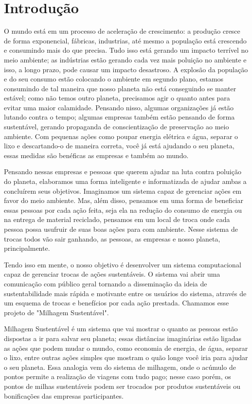 \documentclass[]{article}
\begin{document}
 \section {Introdução}
 O mundo está em um processo de aceleração de crescimento: a produção cresce de forma exponencial, fábricas, industrias, até mesmo a população está crescendo e consumindo mais do que precisa. Tudo isso está gerando um impacto terrível no meio ambiente; as indústrias estão gerando cada vez mais poluição no ambiente e isso, a longo prazo, pode causar um impacto desastroso. A explosão da população e do seu consumo estão colocando o ambiente em segundo plano, estamos consumindo de tal maneira que nosso planeta não está conseguindo se manter estável; como não temos outro planeta, precisamos agir o quanto antes para evitar uma maior calamidade. Pensando nisso, algumas organizações já estão lutando contra o tempo; algumas empresas também estão pensando de forma sustentável, gerando propaganda de conscientização de preservação ao meio ambiente. Com pequenas ações como poupar energia elétrica e água, separar o lixo e descartando-o de maneira correta, você já está ajudando o seu planeta, essas medidas são benéficas as empresas e também ao mundo.

Pensando nessas empresas e pessoas que querem ajudar na luta contra poluição do planeta, elaboramos uma forma inteligente e informatizada de ajudar ambas a concluírem seus objetivos. Imaginamos um sistema capaz de gerenciar ações em favor do meio ambiente. Mas, além disso, pensamos em uma forma de beneficiar essas pessoas por cada ação feita, seja ela na redução do consumo de energia ou na entrega de material reciclado, pensamos em um local de troca onde cada pessoa possa usufruir de suas boas ações para com ambiente. Nesse sistema de trocas todos vão sair ganhando, as pessoas, as empresas e nosso planeta, principalmente.

Tendo isso em mente, o nosso objetivo é desenvolver um sistema computacional capaz de gerenciar trocas de ações sustentáveis. O sistema vai abrir uma comunicação com público geral tornando a disseminação da ideia de sustentabilidade mais rápida e motivante entre os usuários do sistema, através de um esquema de trocas e benefícios por cada ação prestada. Chamamos esse projeto de "Milhagem Sustentável".

Milhagem Sustentável é um sistema que vai mostrar o quanto as pessoas estão dispostas a ir para salvar seu planeta; essas distâncias imaginárias estão ligadas as ações que podem mudar o mundo, como economia de energia, de água, separar o lixo, entre outras ações simples que mostram o quão longe você iria para ajudar o seu planeta. Essa analogia vem do sistema de milhagem, onde o acúmulo de pontos permite a realização de viagens com tudo pago; nesse caso porém, os pontos de milhas sustentáveis podem ser trocados por produtos sustentáveis ou bonificações das empresas participantes.
\end{document}
